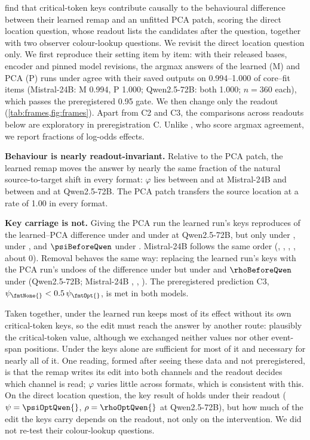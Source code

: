 \citet{anonymous2026fitted} find that critical-token keys contribute causally to the behavioural difference between their learned remap and an unfitted PCA patch, scoring the direct location question, whose readout lists the candidates after the question, together with two observer colour-lookup questions. We revisit the direct location question only. We first reproduce their setting item by item: with their released bases, encoder and pinned model revisions, the argmax answers of the learned (M) and PCA (P) runs under \fmtOpt{} agree with their saved outputs on 0.994--1.000 of core--fit items (Mistral-24B: M 0.994, P 1.000; Qwen2.5-72B: both 1.000; $n = 360$ each), which passes the preregistered 0.95 gate. We then change only the readout (\cref{tab:frames,fig:frames}). Apart from C2 and C3, the comparisons across readouts below are exploratory in preregistration C. Unlike \citet{anonymous2026fitted}, who score argmax agreement, we report fractions of log-odds effects.

\textbf{Behaviour is nearly readout-invariant.} Relative to the PCA patch, the learned remap moves the answer by nearly the same fraction of the natural source-to-target shift in every format: $\varphi$ lies between \phiOptMistral{} and \phiLetterMistral{} at Mistral-24B and between \phiNoneQwen{} and \phiBeforeQwen{} at Qwen2.5-72B. The PCA patch transfers the source location at a rate of 1.00 in every format.

\textbf{Key carriage is not.} Giving the PCA run the learned run's keys reproduces \psiLetterQwen{} of the learned--PCA difference under \fmtLetter{} and \psiOptQwen{} under \fmtOpt{} at Qwen2.5-72B, but only \psiPostQwen{} under \fmtPost{}, \psiNoneQwen{} under \fmtNone{}, and $\psiBeforeQwen$ under \fmtBefore{}. Mistral-24B follows the same order (\psiLetterMistral{}, \psiOptMistral{}, \psiPostMistral{}, \psiNoneMistral{}, about 0). Removal behaves the same way: replacing the learned run's keys with the PCA run's undoes \rhoLetterQwen{} of the difference under \fmtLetter{} but \rhoNoneQwen{} under \fmtNone{} and $\rhoBeforeQwen$ under \fmtBefore{} (Qwen2.5-72B; Mistral-24B \rhoLetterMistral{}, \rhoNoneMistral{}, \rhoBeforeMistral{}). The preregistered prediction C3, $\psi_{\fmtNone{}} < 0.5\,\psi_{\fmtOpt{}}$, is met in both models.

Taken together, under \fmtNone{} the learned run keeps most of its effect without its own critical-token keys, so the edit must reach the answer by another route: plausibly the critical-token value, although we exchanged neither values nor other event-span positions. Under \fmtLetter{} the keys alone are sufficient for most of it and necessary for nearly all of it. One reading, formed after seeing these data and not preregistered, is that the remap writes its edit into both channels and the readout decides which channel is read; $\varphi$ varies little across formats, which is consistent with this. On the direct location question, the key result of \citet{anonymous2026fitted} holds under their readout ($\psi = \psiOptQwen{}$, $\rho = \rhoOptQwen{}$ at Qwen2.5-72B), but how much of the edit the keys carry depends on the readout, not only on the intervention. We did not re-test their colour-lookup questions.

